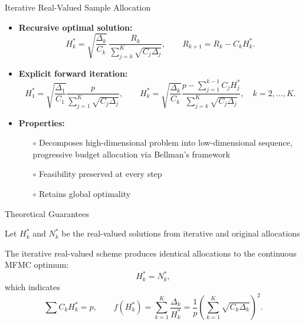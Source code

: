 \documentclass{beamer}
\begin{document}
\begin{frame}{Iterative Real-Valued Sample Allocation}
\begin{itemize}[leftmargin=5pt] 
\item \textcolor{myblue3}{\bf Recursive optimal solution:}
{\footnotesize
\[
H_k^* = \sqrt{\frac{\Delta_k}{C_k}} \,
\frac{R_k}{\sum_{j=k}^K\sqrt{C_j\Delta_j}},
\qquad 
R_{k+1} = R_k - C_k H_k^*.
\]
}
\item \textcolor{myblue3}{\bf  Explicit forward iteration:}
{\footnotesize
\[
H_1^* = \sqrt{\frac{\Delta_1}{C_1}} \frac{p}{\sum_{j=1}^K\sqrt{C_j\Delta_j}},
\qquad 
H_k^* = \sqrt{\frac{\Delta_k}{C_k}} 
\frac{p-\sum_{j=1}^{k-1}C_jH_j^*}{\sum_{j=k}^K\sqrt{C_j\Delta_j}}, \quad k=2,\ldots, K.
\]
}
\vspace{2mm}
\item \textcolor{myblue3}{\bf  Properties:}
{\footnotesize
\begin{itemize}[leftmargin=15pt] 
    \item[$\circ$] Decomposes high-dimensional problem into low-dimensional sequence, progressive budget allocation via Bellman’s framework
    \item[$\circ$] Feasibility preserved at every step
    \item[$\circ$] Retains global optimality 
\end{itemize}
}
\end{itemize}
\end{frame}





\begin{frame}{Theoretical Guarantees}

{\footnotesize
Let $H_k^*$ and $N_k^*$ be the real-valued solutions from iterative and original allocations
}
\begin{theorem}
{\footnotesize
The iterative real-valued scheme produces identical allocations to the continuous MFMC optimum:
\[
H_k^* = N_k^*,
\]
which indicates
\[
\sum C_k H_k^* = p, \qquad  
f(H_k^*) = \sum_{k=1}^K \frac{\Delta_k}{H_k^*} = \frac{1}{p} \left(\sum_{k=1}^K \sqrt{C_k\Delta_k}\right)^2.
\]
}
\end{theorem}

\end{frame}
\end{document}
